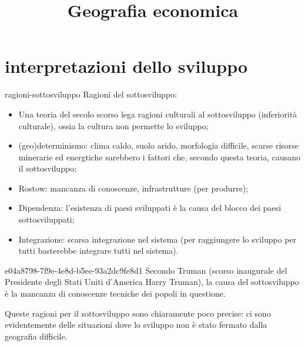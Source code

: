 \documentclass[preview]{standalone}
\begin{document}
\title{Geografia economica}
\genpage

\section{interpretazioni dello sviluppo}


\begin{snippet}{ragioni-sottosviluppo}
    Ragioni del sottosviluppo:
    \begin{itemize}
        \item Una teoria del secolo scorso lega ragioni culturali al sottosviluppo (inferiorità culturale),
            ossia la cultura non permette lo sviluppo;
        \item (geo)determinismo: clima caldo, suolo arido, morfologia difficile,
            scarse risorse minerarie ed energtiche sarebbero i fattori che, secondo questa teoria, causano il sottosviluppo;
        \item Rostow: mancanza di conoscenze, infrastrutture (per produrre);
        \item Dipendenza: l'esistenza di paesi sviluppati è la causa del blocco dei paesi sottosviluppati;
        \item Integrazione: scarsa integrazione nel sistema (per raggiungere lo sviluppo per tutti basterebbe integrare tutti nel sistema).
    \end{itemize}
\end{snippet}

\begin{snippet}{e04a8798-7f9e-4e8d-b5ee-93a2dc9fe8d1}
    Secondo Truman (scorso inaugurale del Presidente degli Stati Uniti d'America Harry Truman),
    la causa del sottosviluppo è la mancanza di conoscenze tecniche dei popoli in questione.
    
    Queste ragioni per il sottosviluppo sono chiaramente poco precise: ci sono
    evidentemente delle situazioni dove lo sviluppo non è stato fermato dalla geografia difficile.
\end{snippet}


\end{document}
